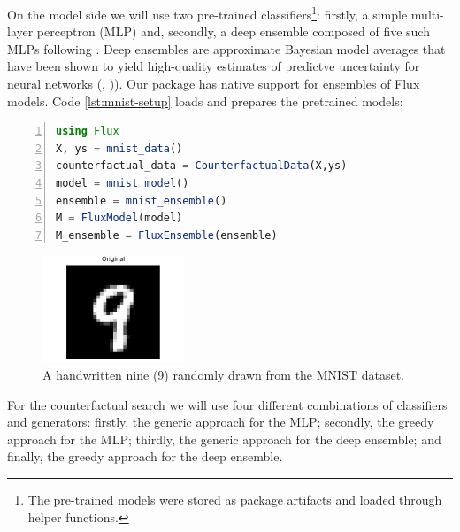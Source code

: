 \documentclass[
  letterpaper,
  DIV=11,
  numbers=noendperiod]{scrartcl}
\begin{document}
On the model side we will use two pre-trained classifiers\footnote{The
  pre-trained models were stored as package artifacts and loaded through
  helper functions.}: firstly, a simple multi-layer perceptron (MLP)
and, secondly, a deep ensemble composed of five such MLPs following
\cite{schut2021generating}. Deep ensembles are approximate Bayesian
model averages that have been shown to yield high-quality estimates of
predictve uncertainty for neural networks (\cite{wilson2019case},
\cite{lakshminarayanan2016simple})). Our package has native support for
ensembles of Flux models. Code \ref{lst:mnist-setup} loads and prepares
the pretrained models:

\begin{lstlisting}[language=Julia, escapechar=@, numbers=left, label={lst:mnist-setup}, caption={}]
using Flux
X, ys = mnist_data() 
counterfactual_data = CounterfactualData(X,ys)
model = mnist_model()
ensemble = mnist_ensemble()
M = FluxModel(model)
M_ensemble = FluxEnsemble(ensemble)
\end{lstlisting}

\begin{figure}

{\centering \includegraphics[width=1.66667in,height=1.25in]{www/mnist_original.png}

}

\caption{\label{fig-mnist-orig}A handwritten nine (9) randomly drawn
from the MNIST dataset.}

\end{figure}

For the counterfactual search we will use four different combinations of
classifiers and generators: firstly, the generic approach for the MLP;
secondly, the greedy approach for the MLP; thirdly, the generic approach
for the deep ensemble; and finally, the greedy approach for the deep
ensemble.
\end{document}
